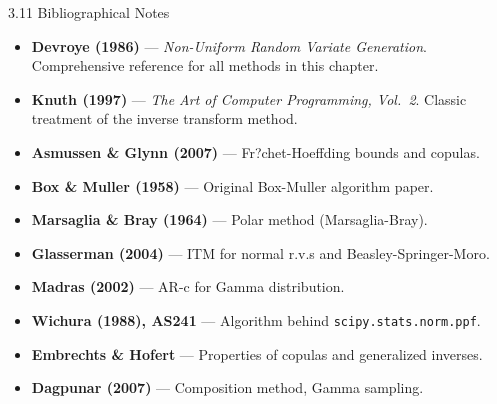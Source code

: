 \documentclass[aspectratio=169,10pt]{beamer}
\begin{document}
\begin{frame}{3.11 Bibliographical Notes}
  \begin{itemize}
    \item \textbf{Devroye (1986)} --- \textit{Non-Uniform Random Variate Generation}.
          Comprehensive reference for all methods in this chapter.
    \item \textbf{Knuth (1997)} --- \textit{The Art of Computer Programming, Vol.\ 2}.
          Classic treatment of the inverse transform method.
    \item \textbf{Asmussen \& Glynn (2007)} --- Fr?chet-Hoeffding bounds and copulas.
    \item \textbf{Box \& Muller (1958)} --- Original Box-Muller algorithm paper.
    \item \textbf{Marsaglia \& Bray (1964)} --- Polar method (Marsaglia-Bray).
    \item \textbf{Glasserman (2004)} --- ITM for normal r.v.s and Beasley-Springer-Moro.
    \item \textbf{Madras (2002)} --- AR-c for Gamma distribution.
    \item \textbf{Wichura (1988), AS241} --- Algorithm behind \texttt{scipy.stats.norm.ppf}.
    \item \textbf{Embrechts \& Hofert} --- Properties of copulas and generalized inverses.
    \item \textbf{Dagpunar (2007)} --- Composition method, Gamma sampling.
  \end{itemize}
\end{frame}
\end{document}

